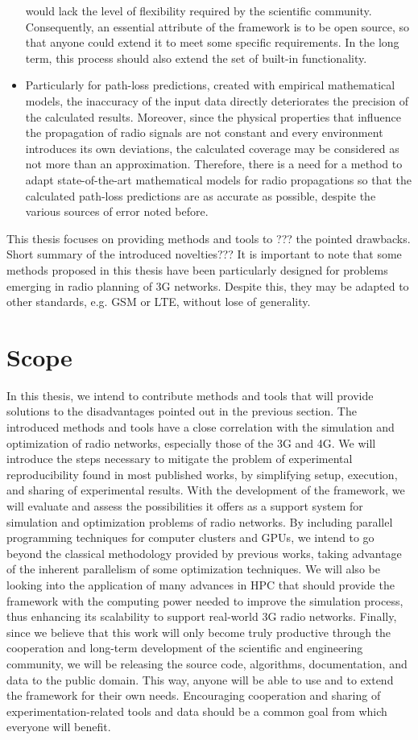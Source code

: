 \begin{itemize}
would lack the level of flexibility required by the scientific community.
Consequently, an essential attribute of the framework is to be open
source, so that anyone could extend it to meet some specific requirements.
In the long term, this process should also extend the set of built-in
functionality.
\item Particularly for path-loss predictions, created with empirical mathematical
models, the inaccuracy of the input data directly deteriorates the
precision of the calculated results. Moreover, since the physical
properties that influence the propagation of radio signals are not
constant and every environment introduces its own deviations, the
calculated coverage may be considered as not more than an approximation.
Therefore, there is a need for a method to adapt state-of-the-art
mathematical models for radio propagations so that the calculated
path-loss predictions are as accurate as possible, despite the various
sources of error noted before.
\end{itemize}
This thesis focuses on providing methods and tools to ??? the pointed
drawbacks. Short summary of the introduced novelties??? It is important
to note that some methods proposed in this thesis have been particularly
designed for problems emerging in radio planning of 3G networks. Despite
this, they may be adapted to other standards, e.g. GSM or LTE, without
lose of generality.


\section{Scope}

In this thesis, we intend to contribute methods and tools that will
provide solutions to the disadvantages pointed out in the previous
section. The introduced methods and tools have a close correlation
with the simulation and optimization of radio networks, especially
those of the 3G and 4G. We will introduce the steps necessary to mitigate
the problem of experimental reproducibility found in most published
works, by simplifying setup, execution, and sharing of experimental
results. With the development of the framework, we will evaluate and
assess the possibilities it offers as a support system for simulation
and optimization problems of radio networks. By including parallel
programming techniques for computer clusters and GPUs, we intend to
go beyond the classical methodology provided by previous works, taking
advantage of the inherent parallelism of some optimization techniques.
We will also be looking into the application of many advances in HPC
that should provide the framework with the computing power needed
to improve the simulation process, thus enhancing its scalability
to support real-world 3G radio networks. Finally, since we believe
that this work will only become truly productive through the cooperation
and long-term development of the scientific and engineering community,
we will be releasing the source code, algorithms, documentation, and
data to the public domain. This way, anyone will be able to use and
to extend the framework for their own needs. Encouraging cooperation
and sharing of experimentation-related tools and data should be a
common goal from which everyone will benefit.


